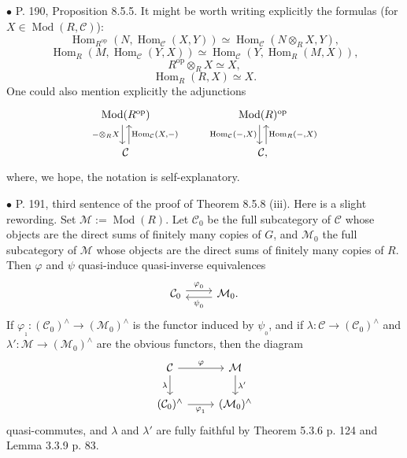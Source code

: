 \documentclass[12pt]{article}
\theoremstyle{remark}%
\newcommand{\bu}{\bullet}
\newcommand{\n}{\noindent}
\newcommand{\C}{\mathcal C}
\newcommand{\M}{\mathcal M}
\newcommand{\p}{\varphi}
\DeclareMathOperator{\Hom}{Hom}
\DeclareMathOperator{\Mod}{Mod}
\DeclareMathOperator{\op}{op}
\begin{document}

\n$\bu$ P. 190, Proposition 8.5.5. It might be worth writing explicitly the formulas (for $X\in\Mod(R,\C)$):
$$
\Hom_{R^{\op}}(N,\Hom_\C(X,Y))\simeq
\Hom_\C\left(N\otimes_RX,Y\right),
$$
$$
\Hom_R(M,\Hom_\C(Y,X))\simeq
\Hom_\C\left(Y,\Hom_R(M,X)\right),
$$
$$
R^{\op}\otimes_RX\simeq X,
$$
$$
\Hom_R(R,X)\simeq X.
$$
One could also mention explicitly the adjunctions
$$
\begin{tikzcd}
\Mod(R^{\op})\ar[xshift=-0.7ex]{d}[swap]{-\otimes_RX}&&&
\Mod(R)^{\op}\ar[xshift=-0.7ex]{d}[swap]{\Hom_\C(-,X)}\\
\C\ar[xshift=0.7ex]{u}[swap]{\Hom_\C(X,-)}&&&\C,\ar[xshift=0.7ex]{u}[swap]{\Hom_R(-,X)}
\end{tikzcd}
$$
where, we hope, the notation is self-explanatory. 


\n$\bu$ P. 191, third sentence of the proof of Theorem 8.5.8 (iii). Here is a slight rewording. Set $\M:=\Mod(R)$. Let $\C_0$ be the full subcategory of $\C$ whose objects are the direct sums of finitely many copies of $G$, and $\M_0$ the full subcategory of $\M$ whose objects are the direct sums of finitely many copies of $R$. Then $\p$ and $\psi$ quasi-induce quasi-inverse equivalences 
$$
\begin{tikzcd}
\C_0\ar[yshift=.7ex]{r}{\p_{{}_0}}&\M_0.\ar[yshift=-.7ex]{l}{\psi_{{}_0}}
\end{tikzcd}
$$ 
If $\p_{{}_1}:(\C_0)^\wedge\to(\M_0)^\wedge$ is the functor induced by $\psi_{{}_0}$, and if $\lambda:\C\to(\C_0)^\wedge$ and $\lambda':\M\to(\M_0)^\wedge$ are the obvious functors, then the diagram 
$$
\begin{tikzcd}
\C\ar{r}{\p}\ar{d}[swap]{\lambda}&\M\ar{d}{\lambda'}\\
(\C_0)^\wedge\ar{r}[swap]{\p_{{}_1}}&(\M_0)^\wedge
\end{tikzcd}
$$ 
quasi-commutes, and $\lambda$ and $\lambda'$ are fully faithful by Theorem 5.3.6 p. 124 and Lemma 3.3.9 p. 83. 

\end{document}
